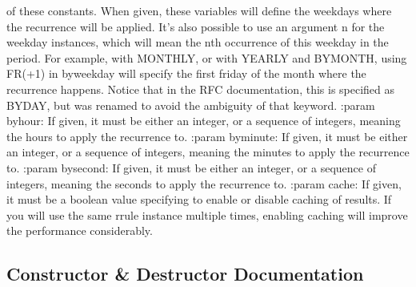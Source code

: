\begin{DoxyVerb}
    of these constants. When given, these variables will define the
    weekdays where the recurrence will be applied. It's also possible to
    use an argument n for the weekday instances, which will mean the nth
    occurrence of this weekday in the period. For example, with MONTHLY,
    or with YEARLY and BYMONTH, using FR(+1) in byweekday will specify the
    first friday of the month where the recurrence happens. Notice that in
    the RFC documentation, this is specified as BYDAY, but was renamed to
    avoid the ambiguity of that keyword.
:param byhour:
    If given, it must be either an integer, or a sequence of integers,
    meaning the hours to apply the recurrence to.
:param byminute:
    If given, it must be either an integer, or a sequence of integers,
    meaning the minutes to apply the recurrence to.
:param bysecond:
    If given, it must be either an integer, or a sequence of integers,
    meaning the seconds to apply the recurrence to.
:param cache:
    If given, it must be a boolean value specifying to enable or disable
    caching of results. If you will use the same rrule instance multiple
    times, enabling caching will improve the performance considerably.\end{DoxyVerb}
 

\subsection{Constructor \& Destructor Documentation}
\mbox{\label{classdateutil_1_1rrule_1_1rrule_a03614b36ee6327ab5a4bb8d736059bb8}} 
